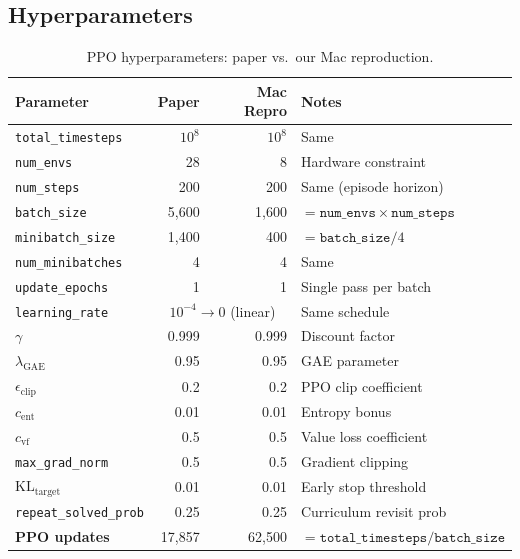 \documentclass[11pt,a4paper]{article}
\begin{document}
\subsection{Hyperparameters}\label{sec:hyperparams}

\begin{table}[h]
\centering
\caption{PPO hyperparameters: paper vs.\ our Mac reproduction.}
\label{tab:hyperparams}
\small
\begin{tabular}{lrrl}
  \toprule
  \textbf{Parameter} & \textbf{Paper} & \textbf{Mac Repro} & \textbf{Notes} \\
  \midrule
  \texttt{total\_timesteps}    & $10^8$  & $10^8$  & Same \\
  \texttt{num\_envs}           & 28      & 8       & Hardware constraint \\
  \texttt{num\_steps}          & 200     & 200     & Same (episode horizon) \\
  \texttt{batch\_size}         & 5{,}600 & 1{,}600 & $= \texttt{num\_envs} \times \texttt{num\_steps}$ \\
  \texttt{minibatch\_size}     & 1{,}400 & 400     & $= \texttt{batch\_size} / 4$ \\
  \texttt{num\_minibatches}    & 4       & 4       & Same \\
  \texttt{update\_epochs}      & 1       & 1       & Single pass per batch \\
  \texttt{learning\_rate}      & \multicolumn{2}{c}{$10^{-4} \to 0$ (linear)} & Same schedule \\
  $\gamma$                     & 0.999   & 0.999   & Discount factor \\
  $\lambda_{\text{GAE}}$       & 0.95    & 0.95    & GAE parameter \\
  $\epsilon_{\text{clip}}$     & 0.2     & 0.2     & PPO clip coefficient \\
  $c_{\text{ent}}$             & 0.01    & 0.01    & Entropy bonus \\
  $c_{\text{vf}}$              & 0.5     & 0.5     & Value loss coefficient \\
  \texttt{max\_grad\_norm}     & 0.5     & 0.5     & Gradient clipping \\
  $\mathrm{KL}_{\text{target}}$& 0.01   & 0.01    & Early stop threshold \\
  \texttt{repeat\_solved\_prob}& 0.25    & 0.25    & Curriculum revisit prob \\
  \midrule
  \textbf{PPO updates}         & 17{,}857 & 62{,}500 & $= \texttt{total\_timesteps} / \texttt{batch\_size}$ \\
  \bottomrule
\end{tabular}
\end{table}
\end{document}
